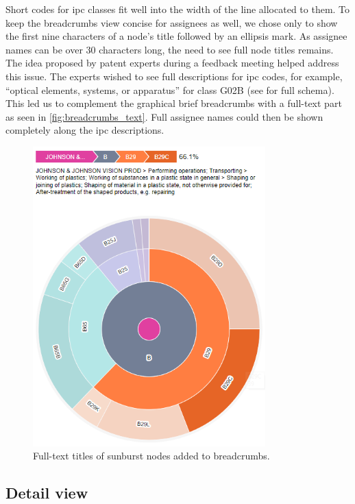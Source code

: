 Short codes for \gls{ipc} classes fit well into the width of the line allocated to them.
To keep the breadcrumbs view concise for assignees as well, we chose only to show the first nine characters of a node's title followed by an ellipsis mark.
As assignee names can be over 30 characters long, the need to see full node titles remains.
The idea proposed by patent experts during a feedback meeting helped address this issue.
The experts wished to see full descriptions for \gls{ipc} codes, for example, ``optical elements, systems, or apparatus'' for class G02B (see \cite{ipc} for full schema).
This led us to complement the graphical brief breadcrumbs with a full-text part as seen in \autoref{fig:breadcrumbs_text}.
Full assignee names could then be shown completely along the \gls{ipc} descriptions.

\begin{figure}[!]
\centering
\includegraphics[width=0.8\textwidth]{img/breadcrumbs_text}
\caption{Full-text titles of sunburst nodes added to breadcrumbs.}
\label{fig:breadcrumbs_text}
\end{figure}

\subsection{Detail view}
\label{subsec:detail_view}

